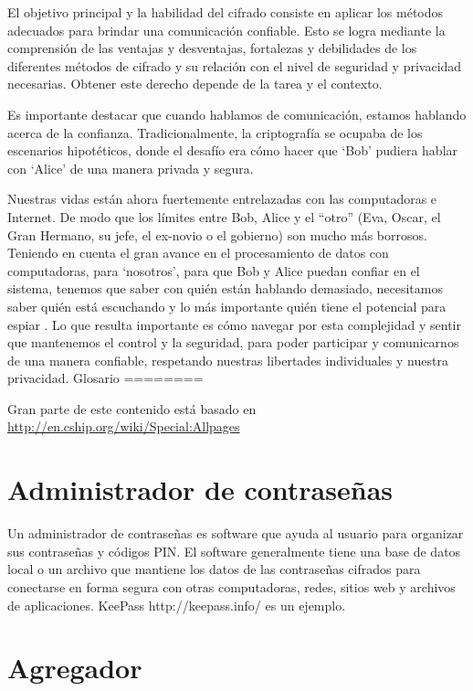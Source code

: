 \documentclass[10pt,a5paper,twoside,,]{book}
\begin{document}
El objetivo principal y la habilidad del cifrado consiste en aplicar los
métodos adecuados para brindar una comunicación confiable. Esto se logra
mediante la comprensión de las ventajas y desventajas, fortalezas y
debilidades de los diferentes métodos de cifrado y su relación con el
nivel de seguridad y privacidad necesarias. Obtener este derecho depende
de la tarea y el contexto.

Es importante destacar que cuando hablamos de comunicación, estamos
hablando acerca de la confianza. Tradicionalmente, la criptografía se
ocupaba de los escenarios hipotéticos, donde el desafío era cómo hacer
que `Bob' pudiera hablar con `Alice' de una manera privada y segura.

Nuestras vidas están ahora fuertemente entrelazadas con las computadoras
e Internet. De modo que los límites entre Bob, Alice y el ``otro'' (Eva,
Oscar, el Gran Hermano, su jefe, el ex-novio o el gobierno) son mucho
más borrosos. Teniendo en cuenta el gran avance en el procesamiento de
datos con computadoras, para `nosotros', para que Bob y Alice puedan
confiar en el sistema, tenemos que saber con quién están hablando
demasiado, necesitamos saber quién está escuchando y lo más importante
quién tiene el potencial para espiar . Lo que resulta importante es cómo
navegar por esta complejidad y sentir que mantenemos el control y la
seguridad, para poder participar y comunicarnos de una manera confiable,
respetando nuestras libertades individuales y nuestra privacidad.
Glosario ========

Gran parte de este contenido está basado en
\url{http://en.cship.org/wiki/Special:Allpages}

\section{Administrador de
contraseñas}\label{administrador-de-contraseuxf1as}

Un administrador de contraseñas es software que ayuda al usuario para
organizar sus contraseñas y códigos PIN. El software generalmente tiene
una base de datos local o un archivo que mantiene los datos de las
contraseñas cifrados para conectarse en forma segura con otras
computadoras, redes, sitios web y archivos de aplicaciones. KeePass
http://keepass.info/ es un ejemplo.

\section{Agregador}\label{agregador}
\end{document}
